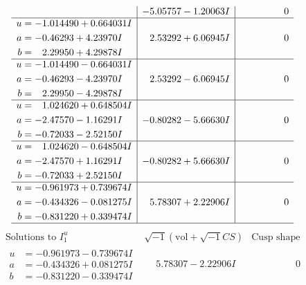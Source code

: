 \documentclass[1p]{elsarticle_modified}
\theoremstyle{definition}
\newcommand{\I}{\sqrt{-1}}
\begin{document}
$$\begin{array}{c|c|c}
 & -5.05757 - 1.20063 I & \phantom{-0.000000 } 0 \\ \hline\begin{aligned}
u &= -1.014490 + 0.664031 I \\
a &= -0.46293 + 4.23970 I \\
b &= \phantom{-}2.29950 + 4.29878 I\end{aligned}
 & \phantom{-}2.53292 + 6.06945 I & \phantom{-0.000000 } 0 \\ \hline\begin{aligned}
u &= -1.014490 - 0.664031 I \\
a &= -0.46293 - 4.23970 I \\
b &= \phantom{-}2.29950 - 4.29878 I\end{aligned}
 & \phantom{-}2.53292 - 6.06945 I & \phantom{-0.000000 } 0 \\ \hline\begin{aligned}
u &= \phantom{-}1.024620 + 0.648504 I \\
a &= -2.47570 - 1.16291 I \\
b &= -0.72033 - 2.52150 I\end{aligned}
 & -0.80282 - 5.66630 I & \phantom{-0.000000 } 0 \\ \hline\begin{aligned}
u &= \phantom{-}1.024620 - 0.648504 I \\
a &= -2.47570 + 1.16291 I \\
b &= -0.72033 + 2.52150 I\end{aligned}
 & -0.80282 + 5.66630 I & \phantom{-0.000000 } 0 \\ \hline\begin{aligned}
u &= -0.961973 + 0.739674 I \\
a &= -0.434326 - 0.081275 I \\
b &= -0.831220 + 0.339474 I\end{aligned}
 & \phantom{-}5.78307 + 2.22906 I & \phantom{-0.000000 } 0\\
 \hline 
 \end{array}$$\newpage$$\begin{array}{c|c|c}  
\text{Solutions to }I^u_{1}& \I (\text{vol} + \sqrt{-1}CS) & \text{Cusp shape}\\
 \hline 
\begin{aligned}
u &= -0.961973 - 0.739674 I \\
a &= -0.434326 + 0.081275 I \\
b &= -0.831220 - 0.339474 I\end{aligned}
 & \phantom{-}5.78307 - 2.22906 I & \phantom{-0.000000 } 0 \\ \hline\begin{aligned}

\end{aligned}
\end{array}$$
\end{document}
